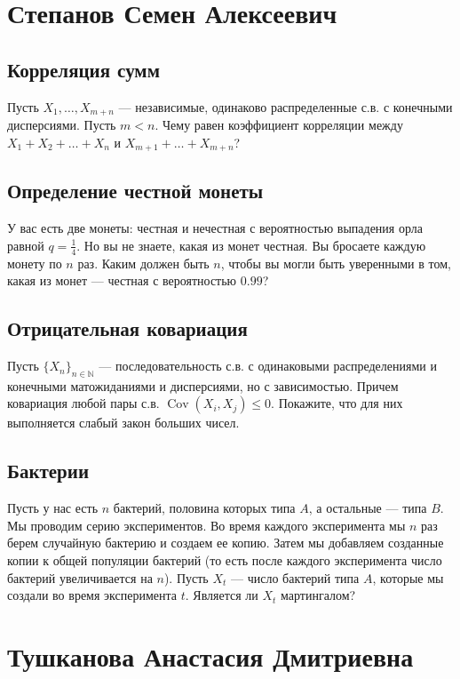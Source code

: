 \documentclass[12pt]{article}
\newcommand\N{\mathbb{N}}
\DeclareMathOperator{\Cov}{Cov}
\begin{document}
\newpage
\section{Степанов Семен Алексеевич}

\subsection{Корреляция сумм}

Пусть $X_1, \dots, X_{m + n}$ --- независимые, одинаково распределенные с.в. с конечными дисперсиями. Пусть $m < n$. Чему равен коэффициент корреляции между $X_1 + X_2 + \dots + X_n$ и $X_{m + 1} + \dots + X_{m + n}$?

\subsection{Определение честной монеты}

У вас есть две монеты: честная и нечестная с вероятностью выпадения орла равной $q = \frac{1}{4}$. Но вы не знаете, какая из монет честная. Вы бросаете каждую монету по $n$ раз. Каким должен быть $n$, чтобы вы могли быть уверенными в том, какая из монет --- честная с вероятностью $0.99$? 


\subsection{Отрицательная ковариация}

Пусть $\{X_n\}_{n \in \N}$ --- последовательность с.в. с одинаковыми распределениями и конечными матожиданиями и дисперсиями, но с зависимостью. Причем ковариация любой пары с.в. $\Cov(X_i, X_j) \le 0$. Покажите, что для них выполняется слабый закон больших чисел.


\subsection{Бактерии}

Пусть у нас есть $n$ бактерий, половина которых типа $A$, а остальные --- типа $B$. Мы проводим серию экспериментов. Во время каждого эксперимента мы $n$ раз берем случайную бактерию и создаем ее копию. Затем мы добавляем созданные копии к общей популяции бактерий (то есть после каждого эксперимента число бактерий увеличивается на $n$). Пусть $X_t$ --- число бактерий типа $A$, которые мы создали во время эксперимента $t$. Является ли $X_t$ мартингалом?


\newpage
\section{Тушканова Анастасия Дмитриевна}
\end{document}
